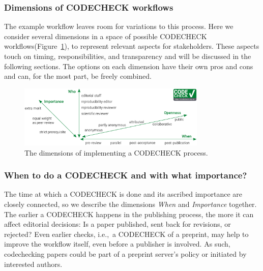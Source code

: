 \documentclass[12pt]{article}
\begin{document}
\subsubsection*{Dimensions of CODECHECK workflows}\label{dimensions-of-workflows}

The example workflow leaves room for variations to this process.
Here we consider several dimensions in a space of possible CODECHECK workflows(Figure~\ref{fig:dimensions}), to represent relevant aspects for stakeholders.
These aspects touch on timing, responsibilities, and 
transparency and will be discussed in the following sections.
The options on each dimension have their own pros and cons and can,
for the most part, be freely combined.

\begin{figure}
  \centering
      \includegraphics[width=0.8\textwidth]{figs/codecheck_dimensions.pdf}
  \caption{The dimensions of implementing a CODECHECK process.}
  \label{fig:dimensions}
\end{figure}

\subsubsection*{When to do a CODECHECK and with what importance?}
\label{when-to-do-a-codecheck}

The time at which a CODECHECK is done and its ascribed importance are closely connected, so we describe the dimensions \emph{When} and \emph{Importance} together.
The earlier a CODECHECK happens in the publishing process, the more it can affect editorial decisions:
Is a paper published, sent back for revisions, or rejected?
Even earlier checks, i.e.,~a CODECHECK of a preprint, may help to improve the workflow itself, even before a publisher is involved.
As such, codechecking papers could be part of a preprint server's
policy or initiated by interested authors.
\end{document}
